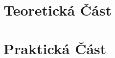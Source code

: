 \documentclass[a4paper,12pt]{article}
\begin{document}










\thispagestyle{empty} 
\tableofcontents
\thispagestyle{empty} 





\newpage
\part{Teoretická Část}



\newpage



\newpage
\part{Praktická Část}



\newpage


\newpage










\end{document}
